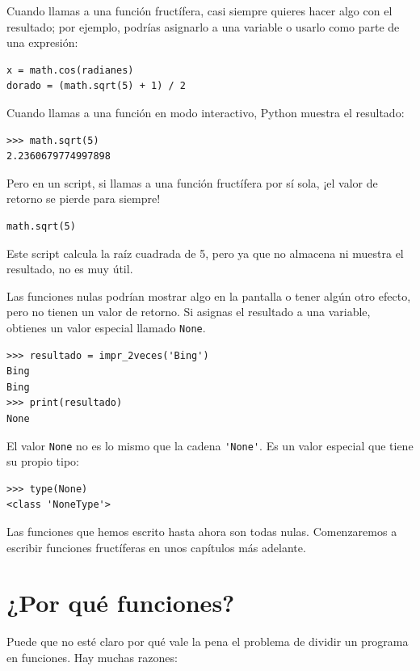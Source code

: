 \documentclass[10pt]{book}
\begin{document}
Cuando llamas a una función fructífera, casi siempre
quieres hacer algo con el resultado; por ejemplo, podrías
asignarlo a una variable o usarlo como parte de una expresión:

\begin{verbatim}
x = math.cos(radianes)
dorado = (math.sqrt(5) + 1) / 2
\end{verbatim}
%
Cuando llamas a una función en modo interactivo, Python muestra
el resultado:

\begin{verbatim}
>>> math.sqrt(5)
2.2360679774997898
\end{verbatim}
%
Pero en un script, si llamas a una función fructífera por sí sola,
¡el valor de retorno se pierde para siempre!

\begin{verbatim}
math.sqrt(5)
\end{verbatim}
%
Este script calcula la raíz cuadrada de 5, pero ya que no almacena
ni muestra el resultado, no es muy útil.

Las funciones nulas podrían mostrar algo en la pantalla o tener algún
otro efecto, pero no tienen un valor de retorno.  Si
asignas el resultado a una variable, obtienes un valor especial llamado
{\tt None}.

\begin{verbatim}
>>> resultado = impr_2veces('Bing')
Bing
Bing
>>> print(resultado)
None
\end{verbatim}
%
El valor {\tt None} no es lo mismo que la cadena \verb"'None'".
Es un valor especial que tiene su propio tipo:

\begin{verbatim}
>>> type(None)
<class 'NoneType'>
\end{verbatim}
%
Las funciones que hemos escrito hasta ahora son todas nulas.  Comenzaremos
a escribir funciones fructíferas en unos capítulos más adelante.


\section{¿Por qué funciones?}

Puede que no esté claro por qué vale la pena el problema de dividir
un programa en funciones.  Hay muchas razones:
\end{document}
